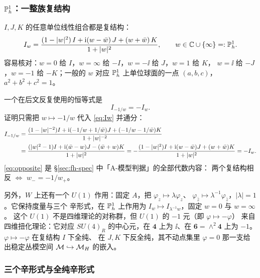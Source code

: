 \subsubsection*{$\mathbb{P}^1_h$：一整族复结构}

$I,J,K$ 的任意单位线性组合都是复结构：
\begin{equation}
I_w=\frac{(1-|w|^2)\,I+\mathrm{i}(w-\bar w)\,J+(w+\bar w)\,K}{1+|w|^2},
\qquad w\in\mathbb{C}\cup\{\infty\}=:\mathbb{P}^1_h .
\label{eq:Iw}
\end{equation}
容易核对：$w=0$ 给 $I$，$w=\infty$ 给 $-I$，$w=-\ii$ 给 $J$，$w=1$ 给 $K$，
$w=\ii$ 给 $-J$，$w=-1$ 给 $-K$；一般的 $w$ 对应 $\mathbb{P}^1_h$ 上单位球面的一点
$(a,b,c)$，$a^2+b^2+c^2=1$。\pA{}

一个在后文反复使用的恒等式是\pB{}
\begin{equation}
I_{-1/w}=-I_w .
\label{eq:opposite}
\end{equation}
证明只需把 $w\mapsto-1/w$ 代入 \eqref{eq:Iw} 并通分：
\begin{align}
I_{-1/w}
&=\frac{(1-|w|^{-2})I+\mathrm{i}(-1/w+1/\bar w)J+(-1/w-1/\bar w)K}{1+|w|^{-2}}\notag\\
&=\frac{(|w|^2-1)I+\mathrm{i}(\bar w-w)J-(\bar w+w)K}{1+|w|^2}
=-\frac{(1-|w|^2)I+\mathrm{i}(w-\bar w)J+(w+\bar w)K}{1+|w|^2}=-I_w .
\label{eq:opposite-proof}
\end{align}
\eqref{eq:opposite} 是 §\ref{sec:fh-spec} 中「A-模型判据」的全部代数内容：
两个复结构相反 $\iff$ $w_-=-1/w_+$。

另外，$W$ 上还有一个 $U(1)$ 作用：固定 $A$，把 $\varphi_z\mapsto\lambda\varphi_z$、
$\varphi_{\bar z}\mapsto\lambda^{-1}\varphi_{\bar z}$，$|\lambda|=1$。它保持度量与三个
辛形式，在 $\mathbb{P}^1_h$ 上作用为 $I_w\mapsto I_{\lambda^{-1}w}$，固定 $w=0$ 与 $w=\infty$。
这个 $U(1)$ 不是四维理论的对称群，但 $U(1)$ 的 $-1$ 元（即 $\varphi\mapsto-\varphi$）
来自四维扭化理论：它对应 $SU(4)_R$ 的中心元，在 $\mathbf 4$ 上为 $\ii$、在
$\mathbf 6=\wedge^2\mathbf 4$ 上为 $-1$。$\varphi\mapsto-\varphi$ 在复结构 $I$ 下全纯、
在 $J,K$ 下反全纯，其不动点集里 $\varphi=0$ 那一支给出稳定丛模空间
$\mathcal M\hookrightarrow\mathcal{M}_H$ 的嵌入。\pA{}

\subsubsection*{三个辛形式与全纯辛形式}

